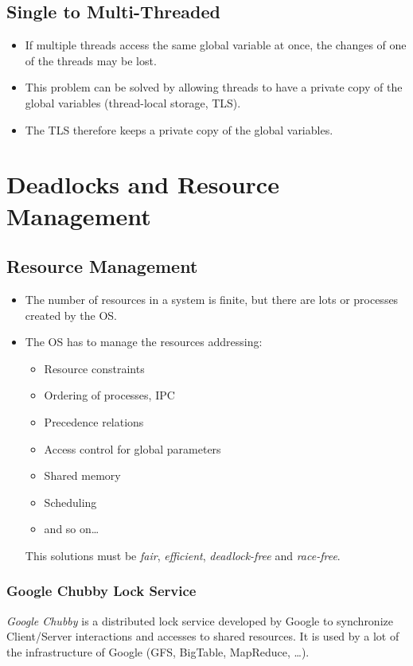     \section{Single to Multi-Threaded}
        \begin{itemize}
        	\item If multiple threads access the same global variable at once, the changes of one of the threads may be lost.
        	\item This problem can be solved by allowing threads to have a private copy of the global variables (thread-local storage, TLS).
        	\item The TLS therefore keeps a private copy of the global variables.
        \end{itemize}

\chapter{Deadlocks and Resource Management}
    \label{c:deadlocks}

    \section{Resource Management}
        \begin{itemize}
        	\item The number of resources in a system is finite, but there are lots or processes created by the OS.
        	\item The OS has to manage the resources addressing:
            	\begin{itemize}
            		\item Resource constraints
            		\item Ordering of processes, IPC
            		\item Precedence relations
            		\item Access control for global parameters
            		\item Shared memory
            		\item Scheduling
            		\item and so on\dots
            	\end{itemize}
            	This solutions must be \textit{fair}, \textit{efficient}, \textit{deadlock-free} and \textit{race-free}.
        \end{itemize}

        \subsection{Google Chubby Lock Service}
            \textit{Google Chubby} is a distributed lock service developed by Google to synchronize Client/Server interactions and accesses to shared resources. It is used by a lot of the infrastructure of Google (GFS, BigTable, MapReduce, \dots).
            
